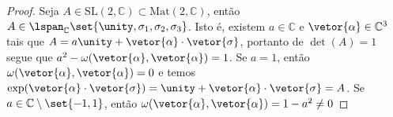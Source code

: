\begin{proof}
    Seja \(A \in \mathrm{SL}(2,\mathbb{C}) \subset \mathrm{Mat}(2, \mathbb{C})\), então \(A \in \lspan_{\mathbb{C}}\set{\unity, \sigma_1, \sigma_2, \sigma_3}\). Isto é, existem \(a \in \mathbb{C}\) e \(\vetor{\alpha} \in \mathbb{C}^3\) tais que \(A = a \unity + \vetor{\alpha}\cdot{\vetor{\sigma}}\), portanto de \(\det(A) = 1\) segue que \(a^2 - \omega(\vetor{\alpha},\vetor{\alpha})= 1\). \todo[O que acontece com \(A = -\unity\)?] Se \(a = 1\), então \(\omega(\vetor{\alpha},\vetor{\alpha}) = 0\) e temos \(\exp(\vetor{\alpha}\cdot\vetor{\sigma}) = \unity + \vetor{\alpha}\cdot\vetor{\sigma} = A\). Se \(a \in \mathbb{C} \setminus\set{-1, 1}\), então \(\omega(\vetor{\alpha}, \vetor{\alpha}) = 1 - a^2 \neq 0\)
\end{proof}
